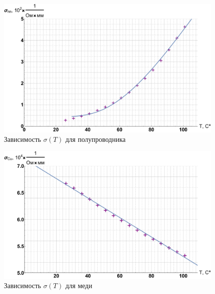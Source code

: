 \documentclass[12pt]{kiarticle}
\begin{document}
	
		\begin{figure}[h]
		\label{graf_pp}
		\includegraphics[scale=0.47]{pp.pdf}
		\caption{Зависимость $ \sigma(T) $ для полупроводника}
	\end{figure}
	
		\begin{figure}[h]
		\includegraphics[scale=0.47]{cu.pdf}
		\caption{Зависимость $ \sigma(T) $ для меди}
				\label{graf_cu}
	\end{figure}
\end{document}
